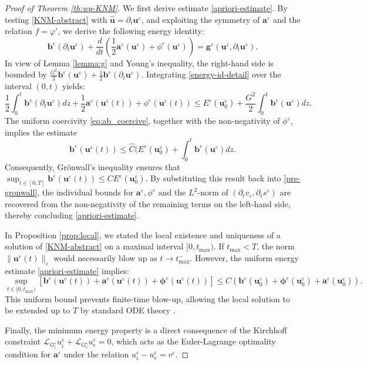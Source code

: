 \documentclass[a4paper,11pt]{article}
\theoremstyle{definition}
\numberwithin{equation}{section}
\newcommand{\e}{\varepsilon}
\begin{document}
\begin{proof}[Proof of Theorem \ref{th:wp-KNM}]
	We first derive estimate \eqref{apriori-estimate}. By testing \eqref{KNM-abstract} with $\widehat{\mathbf{u}} = \partial_t \mathbf{u}^\e$, and exploiting the symmetry of $\mathbf{a}^\e$ and the relation $f = \varphi'$, we derive the following energy identity:
	\begin{equation}
		\label{energy-id-detail}
		\mathbf{b}^\e(\partial_t \mathbf{u}^\e) + \frac{d}{dt} \left( \frac{1}{2}\mathbf{a}^\e(\mathbf{u}^\e) + \phi^\e(\mathbf{u}^\e) \right) = \mathbf{g}^\e(\mathbf{u}^\e, \partial_t \mathbf{u}^\e).
	\end{equation}
	In view of Lemma \ref{lemma:g} and Young's inequality, the right-hand side is bounded by $\frac{G^2}{2} \mathbf{b}^\e(\mathbf{u}^\e) + \frac{1}{2} \mathbf{b}^\e(\partial_t \mathbf{u}^\e)$. Integrating \eqref{energy-id-detail} over the interval $(0, t)$ yields:
	\begin{equation}
		\label{pre-gronwall}
		\frac{1}{2}\int_0^t \mathbf{b}^\e(\partial_t \mathbf{u}^\e) dz + \frac{1}{2}\mathbf{a}^\e(\mathbf{u}^\e(t)) + \phi^\e(\mathbf{u}^\e(t)) \leq E^\e(\mathbf{u}_0^\e) + \frac{G^2}{2} \int_0^t \mathbf{b}^\e(\mathbf{u}^\e) dz.
	\end{equation}
	The uniform coercivity \eqref{eq:ab_coercive}, together with the non-negativity of $\phi^\e$, implies the estimate 
	\[
	\mathbf{b}^\e(\mathbf{u}^\e(t)) \leq \widehat{C}(E^\e(\mathbf{u}_0^\e) + \int_0^t \mathbf{b}^\e(\mathbf{u}^\e) dz.
	\]	 
	Consequently, Gr\"onwall's inequality ensures that $\sup_{t \in [0,T]} \mathbf{b}^\e(\mathbf{u}^\e(t)) \leq C E^\e(\mathbf{u}_0^\e)$. By substituting this result back into \eqref{pre-gronwall}, the individual bounds for $\mathbf{a}^\e, \phi^\e$ and the $L^2$-norm of $(\partial_t v_\e, \partial_t s^\e)$ are recovered from the non-negativity of the remaining terms on the left-hand side, thereby concluding \eqref{apriori-estimate}.
	
	In Proposition \ref{prop:local}, we stated the local existence and uniqueness of a solution of \eqref{KNM-abstract} on a maximal interval $[0, t_{\max})$. If $t_{\max} < T$, the norm $\|\mathbf{u}^\e(t)\|_\e$ would necessarily blow up as $t \to t_{\max}^-$. However, the uniform energy estimate \eqref{apriori-estimate} implies:
	\[ 
	\sup_{t \in [0, t_{\text{max}} )} \left[ \mathbf{b}^\e(\mathbf{u}^\e(t)) + \mathbf{a}^\e(\mathbf{u}^\e(t)) + \mathbf{\phi}^\e(\mathbf{u}^\e(t)) \right]\leq C\left( \mathbf{b}^\e(\mathbf{u}_0^\e) + \mathbf{\phi}^\e(\mathbf{u}_0^\e) + \mathbf{a}^\e(\mathbf{u}_0^\e) \right).
	\]
	This uniform bound prevents finite-time blow-up, allowing the local solution to be extended up to $T$ by standard ODE theory \cite{CL55}.
	
	Finally, the minimum energy property is a direct consequence of the Kirchhoff constraint $\mathcal{L}_{G_i^\e} u_i^{\e} + \mathcal{L}_{G_e^\e} u_e^{\e} = 0$, which acts as the Euler-Lagrange optimality condition for $\mathbf{a}^\e$ under the relation $u_i^{\e} - u_e^{\e} = v^\e$.
\end{proof}
\end{document}
